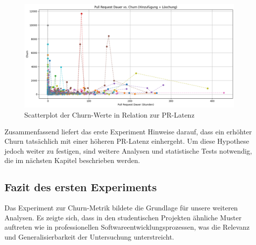 \begin{figure}[th]
\centering
\includegraphics[width=\textwidth]{Figures/pr-latency-churn.png}
\decoRule
\caption{Scatterplot der Churn-Werte in Relation zur PR-Latenz}
\label{fig:pr-latency-churn-added-plus-deleting}
\end{figure}


Zusammenfassend liefert das erste Experiment Hinweise darauf, dass ein erhöhter Churn tatsächlich mit einer höheren PR-Latenz einhergeht. Um diese Hypothese jedoch weiter zu festigen, sind weitere Analysen und statistische Tests notwendig, die im nächsten Kapitel beschrieben werden.


\subsection{Fazit des ersten Experiments}

Das Experiment zur Churn-Metrik bildete die Grundlage für unsere weiteren Analysen. Es zeigte sich, dass in den studentischen Projekten ähnliche Muster auftreten wie in professionellen Softwareentwicklungsprozessen, was die Relevanz und Generalisierbarkeit der Untersuchung unterstreicht.